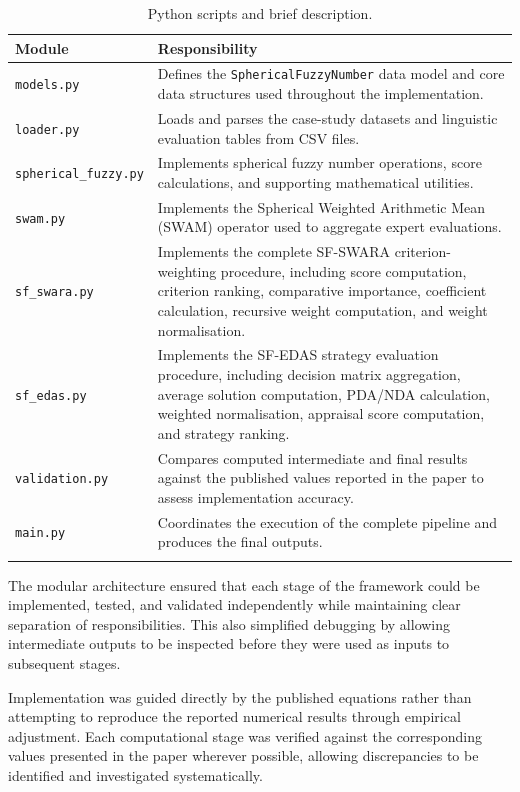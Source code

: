 \documentclass[11pt]{article}
\begin{document}
\begin{longtable}{p{}p{}}
\toprule
\textbf{Module} & \textbf{Responsibility} \\
\midrule
\endhead
\texttt{models.py} & Defines the \texttt{SphericalFuzzyNumber} data model and core data structures used throughout the implementation. \\
\texttt{loader.py} & Loads and parses the case-study datasets and linguistic evaluation tables from CSV files. \\
\texttt{spherical\_fuzzy.py} & Implements spherical fuzzy number operations, score calculations, and supporting mathematical utilities. \\
\texttt{swam.py} & Implements the Spherical Weighted Arithmetic Mean (SWAM) operator used to aggregate expert evaluations. \\
\texttt{sf\_swara.py} & Implements the complete SF-SWARA criterion-weighting procedure, including score computation, criterion ranking, comparative importance, coefficient calculation, recursive weight computation, and weight normalisation. \\
\texttt{sf\_edas.py} & Implements the SF-EDAS strategy evaluation procedure, including decision matrix aggregation, average solution computation, PDA/NDA calculation, weighted normalisation, appraisal score computation, and strategy ranking. \\
\texttt{validation.py} & Compares computed intermediate and final results against the published values reported in the paper to assess implementation accuracy. \\
\texttt{main.py} & Coordinates the execution of the complete pipeline and produces the final outputs. \\
\bottomrule
\caption{Python scripts and brief description.}
\label{tab:modules}
\end{longtable}

The modular architecture ensured that each stage of the framework could be implemented, tested, and validated independently while maintaining clear separation of responsibilities. This also simplified debugging by allowing intermediate outputs to be inspected before they were used as inputs to subsequent stages.

Implementation was guided directly by the published equations rather than attempting to reproduce the reported numerical results through empirical adjustment. Each computational stage was verified against the corresponding values presented in the paper wherever possible, allowing discrepancies to be identified and investigated systematically.
\end{document}
